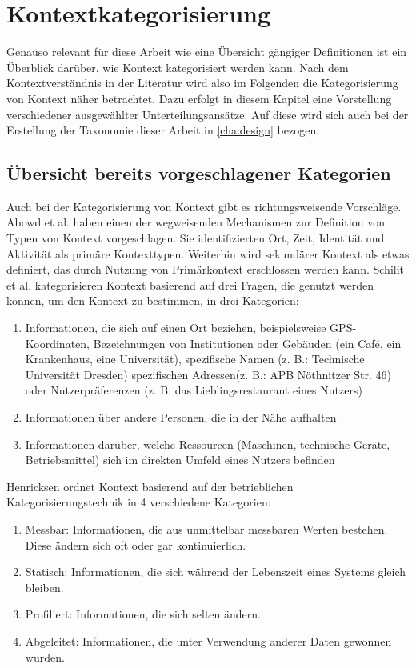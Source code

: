 \section{Kontextkategorisierung}
Genauso relevant für diese Arbeit wie eine Übersicht gängiger Definitionen ist ein Überblick darüber, wie Kontext kategorisiert werden kann. Nach dem Kontextverständnis in der Literatur wird also im Folgenden die Kategorisierung von Kontext näher betrachtet. Dazu erfolgt in diesem Kapitel eine Vorstellung verschiedener ausgewählter Unterteilungsansätze. Auf diese wird sich auch bei der Erstellung der Taxonomie dieser Arbeit in \ref{cha:design} bezogen.
\subsection{Übersicht bereits vorgeschlagener Kategorien} 
Auch bei der Kategorisierung von Kontext gibt es richtungsweisende Vorschläge. Abowd et al. \cite{abowd_towards_1999} haben einen der wegweisenden Mechanismen zur Definition von Typen von Kontext vorgeschlagen. Sie identifizierten Ort, Zeit, Identität und Aktivität als primäre Kontexttypen. Weiterhin wird sekundärer Kontext als etwas definiert, das durch Nutzung von Primärkontext erschlossen werden kann. Schilit et al. \cite{schilit_context-aware_1994} kategorisieren Kontext basierend auf drei Fragen, die genutzt werden können, um den Kontext zu bestimmen, in drei Kategorien:
\begin{enumerate}
\item{Informationen, die sich auf einen Ort beziehen, beispielsweise GPS-Koordinaten, Bezeichnungen von Institutionen oder Gebäuden (ein Café, ein Krankenhaus, eine Universität), spezifische Namen (z. B.: Technische Universität Dresden) spezifischen Adressen(z. B.: APB Nöthnitzer Str. 46) oder Nutzerpräferenzen (z. B. das Lieblingsrestaurant eines Nutzers) }
\item{Informationen über andere Personen, die in der Nähe aufhalten}
\item{Informationen darüber, welche Ressourcen (Maschinen, technische Geräte, Betriebsmittel) sich im direkten Umfeld eines Nutzers befinden}
\end{enumerate}
Henricksen \cite{henricksen2003framework} ordnet Kontext basierend auf der betrieblichen Kategorisierungstechnik in 4 verschiedene Kategorien:
\begin{enumerate}
\item {Messbar: Informationen, die aus unmittelbar messbaren Werten bestehen. Diese ändern sich oft oder gar kontinuierlich. }
\item {Statisch: Informationen, die sich während der Lebenszeit eines Systems gleich bleiben.}
\item {Profiliert: Informationen, die sich selten ändern.}
\item {Abgeleitet: Informationen, die unter Verwendung anderer Daten gewonnen wurden. }
\end{enumerate}
